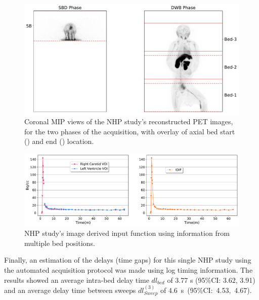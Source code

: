 \begin{figure} [ht!]
\centering
\includegraphics[scale=0.45,angle=0]{3_Results/3_1_DWB_Optimization/figures/3_1_Macaque_PET.pdf}
\caption{Coronal MIP views of the NHP study's reconstructed PET images, for the two phases of the acquisition, with overlay of axial bed start (\protect{}) and end (\protect{}) location.}
\label{fig3_1:Macaque_PET}
\end{figure}
%
%
\begin{figure} [ht!]
\centering
\includegraphics[scale=0.45,angle=0]{3_Results/3_1_DWB_Optimization/figures/3_1_NHP_InputFunction.pdf}
\caption{NHP study's image derived input function using information from multiple bed positions.}
\label{fig3_1:Macaque_PET_input_function}
\end{figure}
%
Finally, an estimation of the delays (time gaps) for this single NHP study using the automated acquisition protocol was made using log timing information. The results showed an average intra-bed delay time $dl_{bed}$ of 3.77 s (95\%CI: 3.62, 3.91) and an average delay time between sweeps $dl_{Sweep}^{(3)}$ of \mbox{4.6 s (95\%CI: 4.53, 4.67).} 


